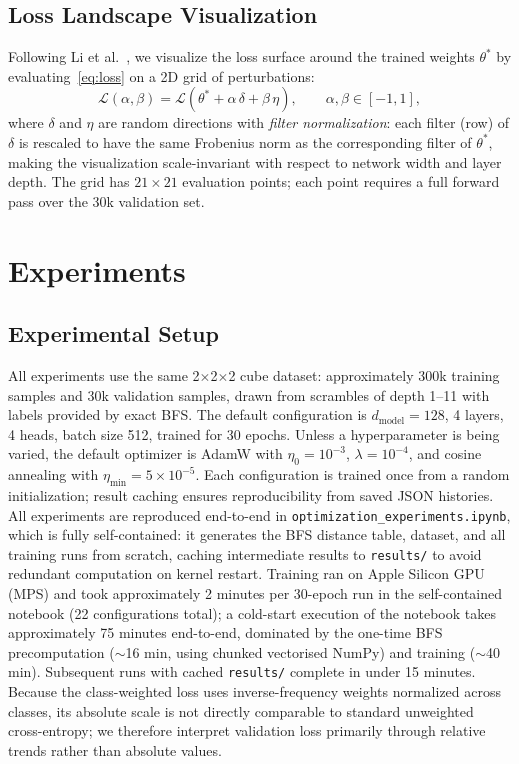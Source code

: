 \documentclass[11pt]{article}
\begin{document}
\subsection{Loss Landscape Visualization}

Following Li et al.~\cite{li2018landscape}, we visualize the loss surface
around the trained weights $\theta^*$ by evaluating~\eqref{eq:loss} on a 2D
grid of perturbations:
\begin{equation}
  \mathcal{L}(\alpha, \beta) = \mathcal{L}(\theta^* + \alpha\,\delta + \beta\,\eta),
  \qquad \alpha, \beta \in [-1, 1],
  \label{eq:landscape}
\end{equation}
where $\delta$ and $\eta$ are random directions with \emph{filter normalization}:
each filter (row) of $\delta$ is rescaled to have the same Frobenius norm as the
corresponding filter of $\theta^*$, making the visualization scale-invariant
with respect to network width and layer depth. The grid has $21 \times 21$
evaluation points; each point requires a full forward pass over the 30k
validation set.

\section{Experiments}
\label{sec:experiments}

\subsection{Experimental Setup}

All experiments use the same 2$\times$2$\times$2 cube dataset: approximately 300k training
samples and 30k validation samples, drawn from scrambles of depth 1--11 with
labels provided by exact BFS. The default configuration is $d_\text{model} = 128$,
4 layers, 4 heads, batch size 512, trained for 30 epochs. Unless a hyperparameter
is being varied, the default optimizer is AdamW with $\eta_0 = 10^{-3}$,
$\lambda = 10^{-4}$, and cosine annealing with $\eta_\text{min} = 5 \times 10^{-5}$.
Each configuration is trained once from a random initialization; result caching
ensures reproducibility from saved JSON histories. All experiments are
reproduced end-to-end in \texttt{optimization\_experiments.ipynb}, which is
fully self-contained: it generates the BFS distance table, dataset, and all
training runs from scratch, caching intermediate results to \texttt{results/}
to avoid redundant computation on kernel restart.
Training ran on Apple Silicon GPU (MPS) and took approximately 2 minutes
per 30-epoch run in the self-contained notebook (22 configurations total);
a cold-start execution of the notebook takes approximately 75 minutes end-to-end,
dominated by the one-time BFS precomputation ($\sim$16 min, using chunked
vectorised NumPy) and training ($\sim$40 min). Subsequent runs with cached
\texttt{results/} complete in under 15 minutes.
Because the class-weighted loss uses inverse-frequency weights normalized across
classes, its absolute scale is not directly comparable to standard unweighted
cross-entropy; we therefore interpret validation loss primarily through relative
trends rather than absolute values.
\end{document}
